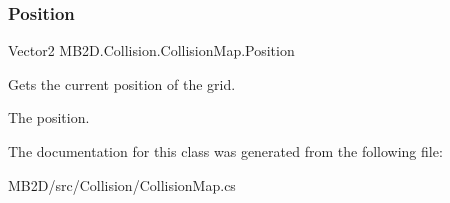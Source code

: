 \subsubsection{\texorpdfstring{Position}{Position}}
{\footnotesize\ttfamily Vector2 M\+B2\+D.\+Collision.\+Collision\+Map.\+Position\hspace{0.3cm}{\ttfamily [get]}}



Gets the current position of the grid. 

The position.

The documentation for this class was generated from the following file\+:\begin{DoxyCompactItemize}
\item 
M\+B2\+D/src/\+Collision/Collision\+Map.\+cs\end{DoxyCompactItemize}
